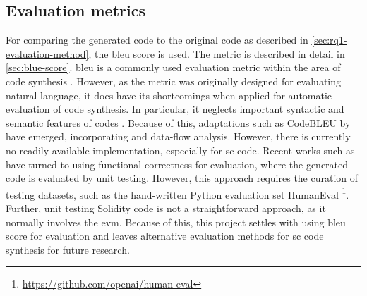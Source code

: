 %
%
%

\subsection{Evaluation metrics}
\label{sec:rq1-evaluation-metrics}
For comparing the generated code to the original code as described in \cref{sec:rq1-evaluation-method}, the \gls{bleu} score is used. The metric is described in detail in \cref{sec:blue-score}. \acrshort{bleu} is a commonly used evaluation metric within the area of code synthesis \cite{ren2020codebleu}. However, as the metric was originally designed for evaluating natural language, it does have its shortcomings when applied for automatic evaluation of code synthesis. In particular, it neglects important syntactic and semantic features of codes \cite{ren2020codebleu}. Because of this, adaptations such as CodeBLEU by \textcite{ren2020codebleu} have emerged, incorporating  and data-flow analysis. However, there is currently no readily available implementation, especially for \acrshort{sc} code. Recent works such as \cite{alphacode,lachaux2020unsupervised,chen2021codex} have turned to using functional correctness for evaluation, where the generated code is evaluated by unit testing. However, this approach requires the curation of testing datasets, such as the hand-written Python evaluation set HumanEval \footnote{\url{https://github.com/openai/human-eval}}. Further, unit testing Solidity code is not a straightforward approach, as it normally involves the \acrshort{evm}. Because of this, this project settles with using \gls{bleu} score for evaluation and leaves alternative evaluation methods for \acrshort{sc} code synthesis for future research.



